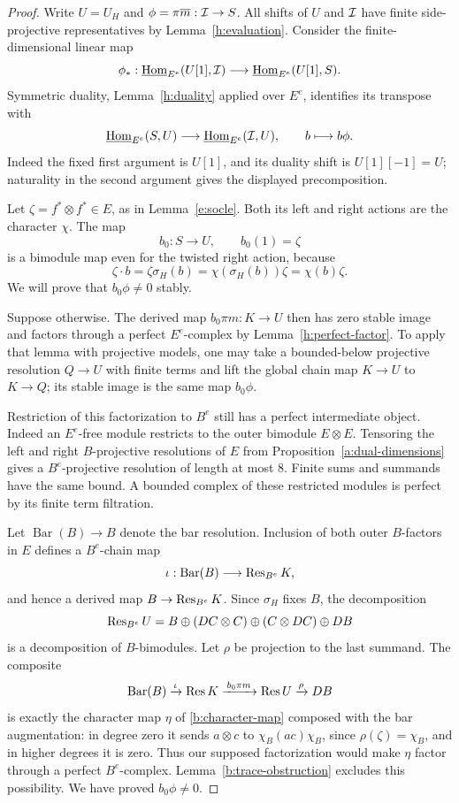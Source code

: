 \begin{proof}
Write \(U=U_H\) and
\(\phi=\pi\overline m:\mathcal I\to S\).
All shifts of \(U\) and \(\mathcal I\) have finite side-projective
representatives by Lemma~\ref{h:evaluation}.
Consider the finite-dimensional linear map
\[
 \phi_*:\underline{\operatorname{Hom}}_{E^e}(U[1],\mathcal I)
 \longrightarrow\underline{\operatorname{Hom}}_{E^e}(U[1],S).
\]
Symmetric duality, Lemma~\ref{h:duality} applied over \(E^e\),
identifies its transpose with
\begin{equation}\label{b:transpose}
 \underline{\operatorname{Hom}}_{E^e}(S,U)\longrightarrow\underline{\operatorname{Hom}}_{E^e}(\mathcal I,U),
 \qquad b\longmapsto b\phi.
\end{equation}
Indeed the fixed first argument is \(U[1]\), and its duality
shift is \(U[1][-1]=U\); naturality in the second argument gives
the displayed precomposition.

Let \(\zeta=f^*\otimes f^*\in E\), as in
Lemma~\ref{e:socle}.  Both its left and right actions
are the character \(\chi\).  The map
\[
 b_0:S\longrightarrow U,\qquad b_0(1)=\zeta
\]
is a bimodule map even for the twisted right action, because
\[
 \zeta\cdot b=\zeta\sigma_H(b)
       =\chi(\sigma_H(b))\zeta=\chi(b)\zeta.
\]
We will prove that \(b_0\phi\ne0\) stably.

Suppose otherwise.  The derived map \(b_0\pi m:K\to U\)
then has zero stable image and factors through a perfect
\(E^e\)-complex by Lemma~\ref{h:perfect-factor}.
To apply that lemma with projective models, one may take a
bounded-below projective resolution \(Q\to U\) with finite terms and lift the
global chain map \(K\to U\) to \(K\to Q\); its stable image is
the same map \(b_0\phi\).

Restriction of this factorization to \(B^e\) still has a perfect
intermediate object.  Indeed an \(E^e\)-free module restricts to
the outer bimodule \(E\otimes E\).  Tensoring the left and
right \(B\)-projective resolutions of \(E\) from
Proposition~\ref{a:dual-dimensions} gives a \(B^e\)-projective
resolution of length at most \(8\).  Finite sums and summands
have the same bound.  A bounded complex of these restricted
modules is perfect by its finite term filtration.

Let \(\operatorname{Bar}(B)\to B\) denote the bar resolution.
Inclusion of both outer \(B\)-factors in \(E\) defines a
\(B^e\)-chain map
\[
 \iota:\operatorname{Bar}(B)\longrightarrow\operatorname{Res}_{B^e}K,
\]
and hence a derived map \(B\to\operatorname{Res}_{B^e}K\).
Since \(\sigma_H\) fixes \(B\), the decomposition
\[
 \operatorname{Res}_{B^e}U
   =B\oplus(DC\otimes C)\oplus(C\otimes DC)\oplus DB
\]
is a decomposition of \(B\)-bimodules.  Let \(\rho\) be projection
to the last summand.  The composite
\[
 \operatorname{Bar}(B)\xrightarrow{\iota}\operatorname{Res} K
 \xrightarrow{\,b_0\pi m\,}\operatorname{Res} U\xrightarrow{\rho}DB
\]
is exactly the character map \(\eta\) of
\eqref{b:character-map} composed with the bar augmentation:
in degree zero it sends \(a\otimes c\) to
\(\chi_B(ac)\chi_B\), since \(\rho(\zeta)=\chi_B\), and in
higher degrees it is zero.
Thus our supposed factorization would make \(\eta\) factor
through a perfect \(B^e\)-complex.
Lemma~\ref{b:trace-obstruction} excludes this possibility.
We have proved \(b_0\phi\ne0\).


\end{proof}
